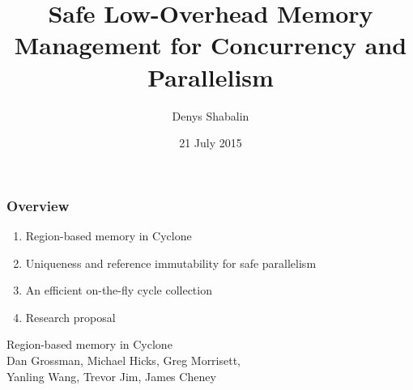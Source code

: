 \newcommand{\rts}{\ \dashv\ }

%
%
%

\title{Safe Low-Overhead Memory Management for Concurrency and Parallelism}
\author{Denys Shabalin}
\date{21 July 2015}
{
\begin{frame}
    \titlepage
\end{frame}
}


\begin{frame}
    \frametitle{Overview}
    \begin{enumerate}
        \item Region-based memory in Cyclone
        \item Uniqueness and reference immutability for safe parallelism
        \item An efficient on-the-fly cycle collection
        \item Research proposal
    \end{enumerate}
\end{frame}

\begin{frame}
    \begin{center}
        {\LARGE Region-based memory in Cyclone} \\
        \vspace{20pt}
        Dan Grossman, Michael Hicks, Greg Morrisett,\\
        Yanling Wang, Trevor Jim, James Cheney
    \end{center}
\end{frame}

